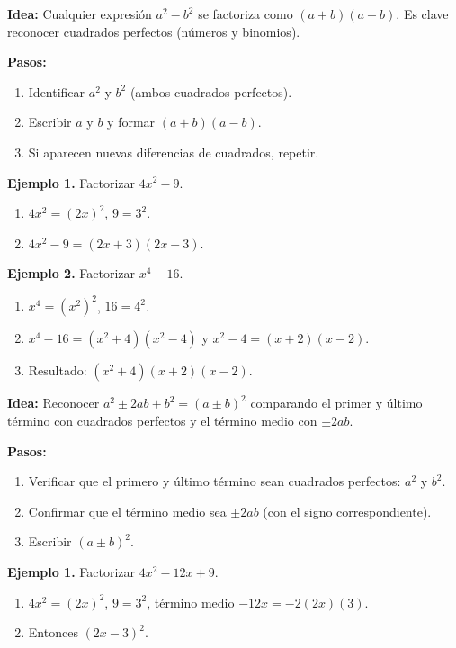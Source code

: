 \textbf{Idea:} Cualquier expresión $a^2-b^2$ se factoriza como $(a+b)(a-b)$. Es clave reconocer cuadrados perfectos (números y binomios).

\textbf{Pasos:}
\begin{enumerate}
  \item Identificar $a^2$ y $b^2$ (ambos cuadrados perfectos).
  \item Escribir $a$ y $b$ y formar $(a+b)(a-b)$.
  \item Si aparecen nuevas diferencias de cuadrados, repetir.
\end{enumerate}

\begin{example}
\textbf{Ejemplo 1.} Factorizar $4x^2-9$.
\begin{enumerate}
  \item $4x^2=(2x)^2$, $9=3^2$.
  \item $4x^2-9=(2x+3)(2x-3)$.
\end{enumerate}
\end{example}

\begin{example}
\textbf{Ejemplo 2.} Factorizar $x^4-16$.
\begin{enumerate}
  \item $x^4=(x^2)^2$, $16=4^2$.
  \item $x^4-16=(x^2+4)(x^2-4)$ y $x^2-4=(x+2)(x-2)$.
  \item Resultado: $(x^2+4)(x+2)(x-2)$.
\end{enumerate}
\end{example}


\textbf{Idea:} Reconocer $a^2\pm 2ab + b^2=(a\pm b)^2$ comparando el primer y último término con cuadrados perfectos y el término medio con $\pm 2ab$.

\textbf{Pasos:}
\begin{enumerate}
  \item Verificar que el primero y último término sean cuadrados perfectos: $a^2$ y $b^2$.
  \item Confirmar que el término medio sea $\pm 2ab$ (con el signo correspondiente).
  \item Escribir $(a\pm b)^2$.
\end{enumerate}

\begin{example}
\textbf{Ejemplo 1.} Factorizar $4x^2-12x+9$.
\begin{enumerate}
  \item $4x^2=(2x)^2$, $9=3^2$, término medio $-12x=-2(2x)(3)$.
  \item Entonces $(2x-3)^2$.
\end{enumerate}
\end{example}

